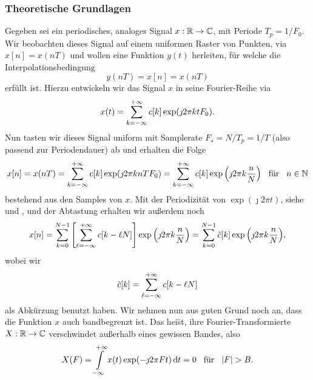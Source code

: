 %
%
\subsubsection{Theoretische Grundlagen}\label{sec:dftintp:theory}
%
Gegeben sei ein periodisches, analoges Signal $x: \mathbb{R} \rightarrow \mathbb{C}$, mit Periode $T_p = 1/F_0$. 
Wir beobachten dieses Signal auf einem uniformen Raster von Punkten, via $x[n] = x(n T)$ und wollen eine Funktion $y(t)$ herleiten, f\"ur welche die Interpolationsbedingung
\begin{equation}\label{eq:dftintp:interpol_cond}
    y(nT) = x[n] = x(nT)
\end{equation}
erf\"ullt ist. 
Hierzu entwickeln wir das Signal $x$ in seine Fourier-Reihe via
\begin{equation}\label{eq:dftintp:fourier_series}
    x(t) = {\sum\limits_{k=-\infty}^{+\infty}{
        c[k] \exp(\jmath 2 \pi k t F_0) 
    }}.
\end{equation}
Nun tasten wir dieses Signal uniform mit Samplerate $F_s = N/T_p = 1/T$ (also passend zur Periodendauer) ab und erhalten die Folge 
\begin{equation}
    x[n] = x(n T) = {\sum\limits_{k=-\infty}^{+\infty}{
        c[k] \exp(\jmath 2 \pi k n T F_0) 
    }} = {\sum\limits_{k=-\infty}^{+\infty}{
        c[k] \exp\left(\jmath 2 \pi k \frac nN\right) 
    }}
    {\hspace{3mm} \text{f\"ur} \hspace{3mm}}
    n \in \mathbb{N}
\end{equation}
bestehend aus den Samples von $x$. 
Mit der Periodizit\"at von $\exp(\jmath 2 \pi t)$, siehe  und , und der Abtastung erhalten wir au{\ss}erdem noch
\begin{equation}
    x[n] = {\sum\limits_{k=0}^{N-1}{
        \left[{\sum\limits_{\ell=-\infty}^{+\infty}{
            c[k - \ell N]
        }}\right] \exp\left(\jmath 2 \pi k \frac nN\right) 
    }} = {\sum\limits_{k=0}^{N-1}{
        \tilde{c}[k] \exp\left(\jmath 2 \pi k \frac nN\right) 
    }},
\end{equation}
wobei wir 
\begin{equation}\label{eq:dftintp:aliased_ck}
    \tilde{c}[k] = {\sum\limits_{\ell=-\infty}^{+\infty}{
        c[k - \ell N]
    }}
\end{equation}
als Abk\"urzung benutzt haben. 
Wir nehmen nun aus guten Grund noch an, dass die Funktion $x$ auch bandbegrenzt ist.
Das hei\"st, ihre Fourier-Transformierte $X : \mathbb{R} \rightarrow \mathbb{C}$ verschwindet au{\ss}erhalb eines gewissen Bandes, also
\begin{equation}
    X(F) = {\int\limits_{-\infty}^{+\infty}{x(t) \exp(-\jmath 2 \pi F t )}\,\mathrm{d}{t}} = 0 {\hspace{3mm} \text{f\"ur} \hspace{3mm}} {\left| F \right|} > B.
\end{equation}
